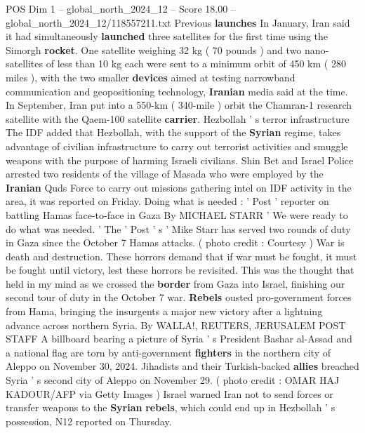 \begin{textsample}{POS Dim 1 – global\_north\_2024\_12 – Score 18.00 – global\_north\_2024\_12/118557211.txt}
Previous \textbf{launches} In January, Iran said it had simultaneously \textbf{launched} three satellites for the first time using the Simorgh \textbf{rocket}.
One satellite weighing 32 kg ( 70 pounds ) and two nano-satellites of less than 10 kg each were sent to a minimum orbit of 450 km ( 280 miles ), with the two smaller \textbf{devices} aimed at testing narrowband communication and geopositioning technology, \textbf{Iranian} media said at the time.
In September, Iran put into a 550-km ( 340-mile ) orbit the Chamran-1 research satellite with the Qaem-100 satellite \textbf{carrier}.
Hezbollah ' s terror infrastructure The IDF added that Hezbollah, with the support of the \textbf{Syrian} regime, takes advantage of civilian infrastructure to carry out terrorist activities and smuggle weapons with the purpose of harming Israeli civilians.
Shin Bet and Israel Police arrested two residents of the village of Masada who were employed by the \textbf{Iranian} Quds Force to carry out missions gathering intel on IDF activity in the area, it was reported on Friday.
Doing what is needed : ' Post ' reporter on battling Hamas face-to-face in Gaza By MICHAEL STARR ' We were ready to do what was needed. ' The ' Post ' s ' Mike Starr has served two rounds of duty in Gaza since the October 7 Hamas attacks. ( photo credit : Courtesy ) War is death and destruction.
These horrors demand that if war must be fought, it must be fought until victory, lest these horrors be revisited.
This was the thought that held in my mind as we crossed the \textbf{border} from Gaza into Israel, finishing our second tour of duty in the October 7 war. \textbf{Rebels} ousted pro-government forces from Hama, bringing the insurgents a major new victory after a lightning advance across northern Syria.
By WALLA!, REUTERS, JERUSALEM POST STAFF A billboard bearing a picture of Syria ' s President Bashar al-Assad and a national flag are torn by anti-government \textbf{fighters} in the northern city of Aleppo on November 30, 2024.
Jihadists and their Turkish-backed \textbf{allies} breached Syria ' s second city of Aleppo on November 29. ( photo credit : OMAR HAJ KADOUR/AFP via Getty Images ) Israel warned Iran not to send forces or transfer weapons to the \textbf{Syrian} \textbf{rebels}, which could end up in Hezbollah ' s possession, N12 reported on Thursday.

\end{textsample}
